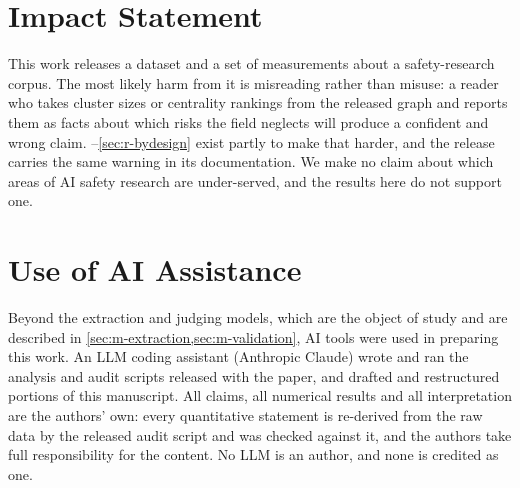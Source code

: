 \documentclass[10pt,twocolumn,letterpaper]{article}
\begin{document}

\section*{Impact Statement}
\label{sec:impact}

This work releases a dataset and a set of measurements about a safety-research corpus.
The most likely harm from it is misreading rather than misuse: a reader who takes cluster
sizes or centrality rankings from the released graph and reports them as facts about
which risks the field neglects will produce a confident and wrong claim.
--\cref{sec:r-bydesign} exist partly to make that harder, and the release
carries the same warning in its documentation. We make no claim about which areas of AI
safety research are under-served, and the results here do not support one.

\section*{Use of AI Assistance}
\label{sec:aidisclosure}

Beyond the extraction and judging models, which are the object of study and are described
in \cref{sec:m-extraction,sec:m-validation}, AI tools were used in preparing this work.
An LLM coding assistant (Anthropic Claude) wrote and ran the analysis and audit scripts
released with the paper, and drafted and restructured portions of this manuscript. All
claims, all numerical results and all interpretation are the authors' own: every
quantitative statement is re-derived from the raw data by the released audit script and
was checked against it, and the authors take full responsibility for the content. No LLM
is an author, and none is credited as one.
\end{document}
